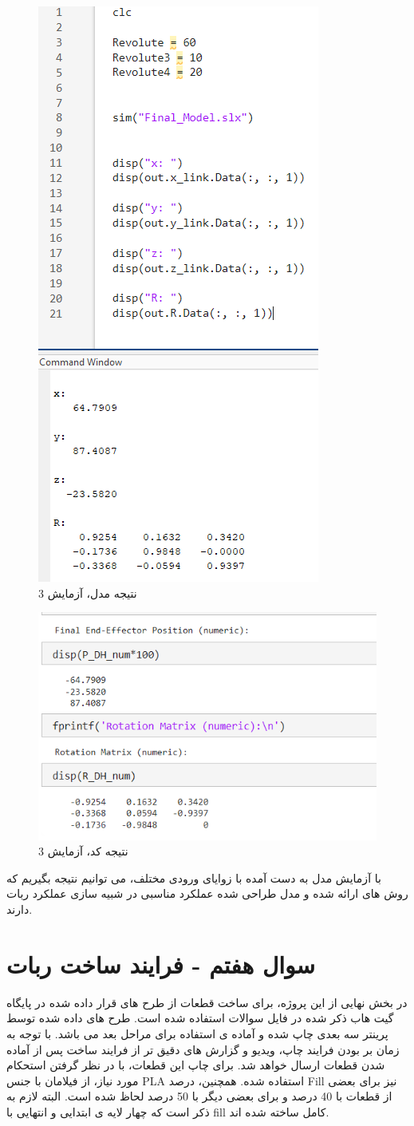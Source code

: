 \documentclass{article}
\begin{document}
\begin{figure}[H]
    \centering
    \includegraphics[width=0.5\linewidth]{result4.PNG}
    \caption{نتیجه مدل، آزمایش 3}
    \label{fig:fig:result4}
\end{figure}

\begin{figure}[H]
    \centering
    \includegraphics[width=0.5\linewidth]{result4_screen.png}
    \caption{نتیجه کد، آزمایش 3}
    \label{fig:enter-label}
\end{figure}

با آزمایش مدل به دست آمده با زوایای ورودی مختلف، می توانیم نتیجه بگیریم که روش های ارائه شده و مدل طراحی شده عملکرد مناسبی در شبیه سازی عملکرد ربات دارند.

\section{سوال هفتم - فرایند ساخت ربات}
در بخش نهایی از این پروژه، برای ساخت قطعات از طرح های قرار داده شده در پایگاه گیت هاب ذکر شده در فایل سوالات استفاده شده است. طرح های داده شده توسط پرینتر سه بعدی چاپ شده و آماده ی استفاده برای مراحل بعد می باشد. با توجه به زمان بر بودن فرایند چاپ، ویدیو و گزارش های دقیق تر از فرایند ساخت پس از آماده شدن قطعات ارسال خواهد شد.
برای چاپ این قطعات، با در نظر گرفتن استحکام مورد نیاز، از فیلامان با جنس PLA استفاده شده.
همچنین، درصد Fill نیز برای بعضی از قطعات با 40 درصد و برای بعضی دیگر با 50 درصد لحاظ شده است. البته لازم به ذکر است که چهار لایه ی ابتدایی و انتهایی با fill کامل ساخته شده اند.
\end{document}
